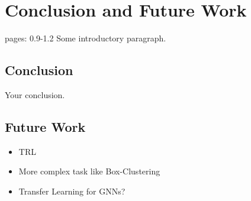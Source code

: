 
\chapter{Conclusion and Future Work}
pages: 0.9-1.2
Some introductory paragraph.


\section{Conclusion}

Your conclusion.


\section{Future Work}
\begin{itemize}[noitemsep,nolistsep]
	\item TRL
	\item More complex task like Box-Clustering
	\item Transfer Learning for GNNs?
\end{itemize}
